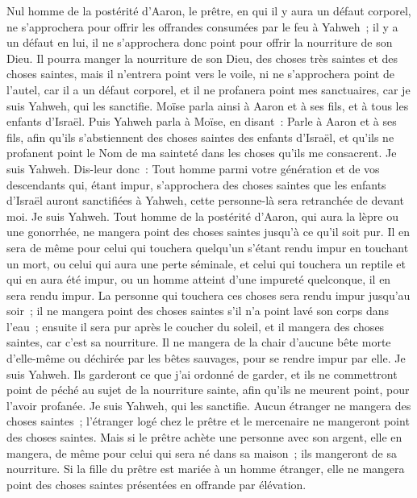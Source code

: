 \begin{multicols}{2}
Nul homme de la postérité d'Aaron, le prêtre, en qui il y aura un défaut corporel, ne s'approchera pour offrir les offrandes consumées par le feu à Yahweh~; il y a un défaut en lui, il ne s'approchera donc point pour offrir la nourriture de son Dieu.
Il pourra manger la nourriture de son Dieu, des choses très saintes et des choses saintes,
mais il n'entrera point vers le voile, ni ne s'approchera point de l'autel, car il a un défaut corporel, et il ne profanera point mes sanctuaires, car je suis Yahweh, qui les sanctifie.
Moïse parla ainsi à Aaron et à ses fils, et à tous les enfants d'Israël.
\VerseOne{}Puis Yahweh parla à Moïse, en disant~:
Parle à Aaron et à ses fils, afin qu'ils s'abstiennent des choses saintes des enfants d'Israël, et qu'ils ne profanent point le Nom de ma sainteté dans les choses qu'ils me consacrent. Je suis Yahweh.
Dis-leur donc~: Tout homme parmi votre génération et de vos descendants qui, étant impur, s'approchera des choses saintes que les enfants d'Israël auront sanctifiées à Yahweh, cette personne-là sera retranchée de devant moi. Je suis Yahweh.
Tout homme de la postérité d'Aaron, qui aura la lèpre ou une gonorrhée, ne mangera point des choses saintes jusqu'à ce qu'il soit pur. Il en sera de même pour celui qui touchera quelqu'un s'étant rendu impur en touchant un mort, ou celui qui aura une perte séminale,
et celui qui touchera un reptile et qui en aura été impur, ou un homme atteint d'une impureté quelconque, il en sera rendu impur.
La personne qui touchera ces choses sera rendu impur jusqu'au soir~; il ne mangera point des choses saintes s'il n'a point lavé son corps dans l'eau~;
ensuite il sera pur après le coucher du soleil, et il mangera des choses saintes, car c'est sa nourriture.
Il ne mangera de la chair d'aucune bête morte d'elle-même ou déchirée par les bêtes sauvages, pour se rendre impur par elle. Je suis Yahweh.
Ils garderont ce que j'ai ordonné de garder, et ils ne commettront point de péché au sujet de la nourriture sainte, afin qu'ils ne meurent point, pour l'avoir profanée. Je suis Yahweh, qui les sanctifie.
Aucun étranger ne mangera des choses saintes~; l'étranger logé chez le prêtre et le mercenaire ne mangeront point des choses saintes.
Mais si le prêtre achète une personne avec son argent, elle en mangera, de même pour celui qui sera né dans sa maison~; ils mangeront de sa nourriture.
Si la fille du prêtre est mariée à un homme étranger, elle ne mangera point des choses saintes présentées en offrande par élévation.

\end{multicols}
